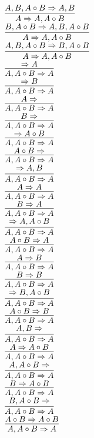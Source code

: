 \documentclass[11pt]{article}
\begin{document}
\begin{center}
\bigskip
\\$\infer{A\Rightarrow A, A\circ B}{A, B, A\circ B\Rightarrow A, B}$
\bigskip
\\$\infer{A\Rightarrow A, A\circ B}{B, A\circ B\Rightarrow A, B, A\circ B}$
\bigskip
\\$\infer{A\Rightarrow A, A\circ B}{A, B, A\circ B\Rightarrow B, A\circ B}$
\bigskip
\\$\infer{A, A\circ B\Rightarrow A}{\Rightarrow A}$
\bigskip
\\$\infer{A, A\circ B\Rightarrow A}{\Rightarrow B}$
\bigskip
\\$\infer{A, A\circ B\Rightarrow A}{A\Rightarrow }$
\bigskip
\\$\infer{A, A\circ B\Rightarrow A}{B\Rightarrow }$
\bigskip
\\$\infer{A, A\circ B\Rightarrow A}{\Rightarrow A\circ B}$
\bigskip
\\$\infer{A, A\circ B\Rightarrow A}{A\circ B\Rightarrow }$
\bigskip
\\$\infer{A, A\circ B\Rightarrow A}{\Rightarrow A, B}$
\bigskip
\\$\infer{A, A\circ B\Rightarrow A}{A\Rightarrow A}$
\bigskip
\\$\infer{A, A\circ B\Rightarrow A}{B\Rightarrow A}$
\bigskip
\\$\infer{A, A\circ B\Rightarrow A}{\Rightarrow A, A\circ B}$
\bigskip
\\$\infer{A, A\circ B\Rightarrow A}{A\circ B\Rightarrow A}$
\bigskip
\\$\infer{A, A\circ B\Rightarrow A}{A\Rightarrow B}$
\bigskip
\\$\infer{A, A\circ B\Rightarrow A}{B\Rightarrow B}$
\bigskip
\\$\infer{A, A\circ B\Rightarrow A}{\Rightarrow B, A\circ B}$
\bigskip
\\$\infer{A, A\circ B\Rightarrow A}{A\circ B\Rightarrow B}$
\bigskip
\\$\infer{A, A\circ B\Rightarrow A}{A, B\Rightarrow }$
\bigskip
\\$\infer{A, A\circ B\Rightarrow A}{A\Rightarrow A\circ B}$
\bigskip
\\$\infer{A, A\circ B\Rightarrow A}{A, A\circ B\Rightarrow }$
\bigskip
\\$\infer{A, A\circ B\Rightarrow A}{B\Rightarrow A\circ B}$
\bigskip
\\$\infer{A, A\circ B\Rightarrow A}{B, A\circ B\Rightarrow }$
\bigskip
\\$\infer{A, A\circ B\Rightarrow A}{A\circ B\Rightarrow A\circ B}$

\end{center}
\end{document}
